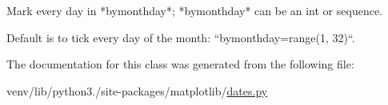 \begin{DoxyVerb}Mark every day in *bymonthday*; *bymonthday* can be an int or sequence.

Default is to tick every day of the month: ``bymonthday=range(1, 32)``.
\end{DoxyVerb}
 

The documentation for this class was generated from the following file\+:\begin{DoxyCompactItemize}
\item 
venv/lib/python3./site-\/packages/matplotlib/\hyperlink{dates_8py}{dates.\+py}\end{DoxyCompactItemize}
